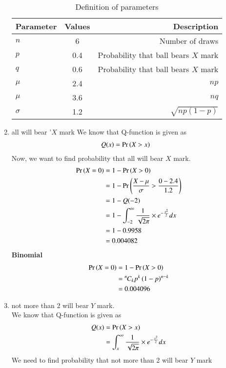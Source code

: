 \documentclass[journal,12pt,twocolumn]{IEEEtran}
\theoremstyle{remark}
\begin{document}
\begin{enumerate}
\begin{table}[!ht]
\centering
\begin{tabular}{|l|c|r|}
    \hline
    Parameter & Values & Description\\
    \hline
    $n$ & 6 & Number of draws\\
    \hline
    $p$ & 0.4 & Probability that ball bears $X$ mark \\
    \hline
    $q$ & 0.6 & Probability that ball bears $X$ mark \\
    \hline
    $\mu$ & 2.4 & $np$ \\
    \hline
    $\mu$ & 3.6& $nq$ \\
    \hline
    $\sigma $ & 1.2 & $\sqrt{np(1 - p)} $\\
    \hline
\end{tabular}
\caption{Definition of parameters}
\label{tab:gaussian/9/3/17}
\end{table}
\item all will bear '$X$ mark
We know that Q-function is given as
\begin{align}
Q(x) &= \Pr\left(X > x\right)
\end{align}
Now, we want to find probability that all will bear $X$ mark.
\begin{align}
\Pr\left(X = 0\right) &=1-\Pr\left(X > 0\right) \\
&=1-\Pr\left(\frac{X - \mu}{\sigma} > \frac{0 - 2.4}{1.2}\right) \\
&= 1- Q(-2)\\
&= 1- \int_{-2}^{\infty}\frac{1}{\sqrt{2\pi}}\times e^{-\frac{x^2}{2}}dx\\
&= 1-0.9958\\
&=0.004082
\end{align}
\textbf{Binomial}
\begin{align}
\Pr\left(X =0\right) &= 1 - \Pr\left(X> 0\right) \\
&= {{}^{n}\mkern-1muC_{k}}p^k\left(1-p\right)^{n-k} \\
&= 0.004096
\end{align}
\item not more than 2 will bear $Y$ mark.\\
We know that Q-function is given as\\
\begin{align}
Q(x) &= \Pr\left(X > x\right)\\
&= \int_{x}^{\infty}\frac{1}{\sqrt{2\pi}}\times e^{-\frac{x^2}{2}}dx
\end{align}
We need to find probability that not more than 2 will bear $Y$ mark
\begin{align}

\end{align}
\end{enumerate}
\end{document}
